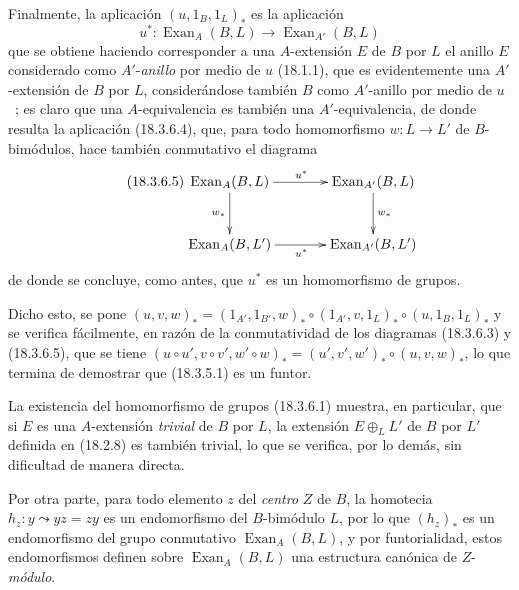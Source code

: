 \begin{env}[18.3.6]
Finalmente, la aplicación $(u,1_B,1_L)_*$ es la aplicación
\begin{equation}
\label{0.18.3.6.4-fr}
\tag{18.3.6.4}
  u^*:\operatorname{Exan}_A(B,L)\longrightarrow
  \operatorname{Exan}_{A'}(B,L)
\end{equation}
que se obtiene haciendo corresponder a una $A$-extensión $E$ de $B$ por $L$
el anillo $E$ considerado como $A'$-\emph{anillo} por medio de $u$ (18.1.1), que
es evidentemente una $A'$-extensión de $B$ por $L$, considerándose también $B$
como $A'$-anillo por medio de $u$~; es claro que una $A$-equivalencia es
también una $A'$-equivalencia, de donde resulta la aplicación (18.3.6.4), que, para todo
homomorfismo $w:L\to L'$ de $B$-bimódulos, hace también conmutativo el diagrama
\begin{equation}
\label{0.18.3.6.5-fr}
\tag{18.3.6.5}
  \xymatrix@C=3pc@R=2.4pc{
    \operatorname{Exan}_A(B,L)\ar[r]^{u^*}\ar[d]_{w_*}
      & \operatorname{Exan}_{A'}(B,L)\ar[d]^{w_*}\\
    \operatorname{Exan}_A(B,L')\ar[r]_{u^*}
      & \operatorname{Exan}_{A'}(B,L')
  }
\end{equation}
de donde se concluye, como antes, que $u^*$ es un homomorfismo de grupos.

Dicho esto, se pone
$(u,v,w)_*=(1_{A'},1_{B'},w)_*\circ(1_{A'},v,1_L)_*
\circ(u,1_B,1_L)_*$ y se verifica fácilmente, en razón de la conmutatividad
de los diagramas (18.3.6.3) y (18.3.6.5), que se tiene
$(u\circ u',v\circ v',w'\circ w)_*=(u',v',w')_*\circ(u,v,w)_*$,
lo que termina de demostrar que (18.3.5.1) es un funtor.

La existencia del homomorfismo de grupos (18.3.6.1) muestra, en particular,
que si $E$ es una $A$-extensión \emph{trivial} de $B$ por $L$, la extensión
$E\oplus_LL'$ de $B$ por $L'$ definida en (18.2.8) es también trivial, lo que
se verifica, por lo demás, sin dificultad de manera directa.

Por otra parte, para todo elemento $z$ del \emph{centro} $Z$ de $B$, la homotecia
$h_z:y\leadsto yz=zy$ es un endomorfismo del $B$-bimódulo $L$, por lo que $(h_z)_*$
es un endomorfismo del grupo conmutativo $\operatorname{Exan}_A(B,L)$, y por
funtorialidad, estos endomorfismos definen sobre
$\operatorname{Exan}_A(B,L)$ una estructura canónica de $Z$-\emph{módulo}.
\end{env}

